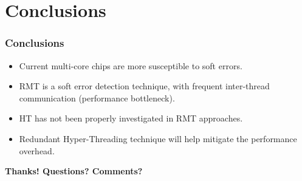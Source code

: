 \documentclass[xcolor=pdftex,dvipsnames,table]{beamer}
\begin{document}

\section{Conclusions}
\begin{frame}
	\frametitle{Conclusions}
        
    \begin{itemize}
        \item Current multi-core chips are more susceptible to soft errors. 
        \item RMT is a soft error detection technique, with frequent inter-thread communication (performance bottleneck). 
        \item HT has not been properly investigated in RMT approaches. 
        \item Redundant Hyper-Threading technique will help mitigate the performance overhead. \pause
     \end{itemize}
     
    \begin{shaded}
    	\centerline{\textbf{Thanks! Questions? Comments?}}
    \end{shaded}
     
\end{frame}

	
\end{document}
